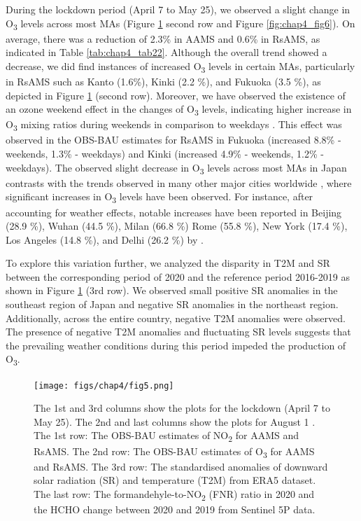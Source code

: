 During the lockdown period (April 7 to May 25), we observed a slight change in O\textsubscript{3} levels across most MAs (Figure \ref{fig:chap4_fig5} second row and Figure \ref{fig:chap4_fig6}). On average, there was a reduction of 2.3\% in AAMS and 0.6\% in RsAMS, as indicated in Table \ref{tab:chap4_tab22}. Although the overall trend showed a decrease, we did find instances of increased O\textsubscript{3} levels in certain MAs, particularly in RsAMS such as Kanto (1.6\%), Kinki (2.2 \%), and Fukuoka (3.5 \%), as depicted in Figure \ref{fig:chap4_fig5} (second row). Moreover, we have observed the existence of an ozone weekend effect in the changes of O\textsubscript{3} levels, indicating higher increase in O\textsubscript{3} mixing ratios during weekends in comparison to weekdays \citep{akimoto2022rethinking}. This effect was observed in the OBS-BAU estimates for RsAMS in Fukuoka (increased 8.8\% - weekends, 1.3\% - weekdays) and Kinki (increased 4.9\% - weekends, 1.2\% - weekdays).
The observed slight decrease in O\textsubscript{3} levels across most MAs in Japan contrasts with the trends observed in many other major cities worldwide \citep{shi2021abrupt,grange2021covid}, where significant increases in O\textsubscript{3} levels have been observed. For instance, after accounting for weather effects, notable increases have been reported in Beijing (28.9 \%), Wuhan (44.5 \%), Milan (66.8 \%) Rome (55.8 \%), New York (17.4 \%), Los Angeles (14.8 \%), and Delhi (26.2 \%) by \citep{shi2021abrupt}.\par
To explore this variation further, we analyzed the disparity in T2M and SR between the corresponding period of 2020 and the reference period 2016-2019 as shown in Figure \ref{fig:chap4_fig5} (3rd row). We observed small positive SR anomalies in the southeast region of Japan and negative SR anomalies in the northeast region. Additionally, across the entire country, negative T2M anomalies were observed. The presence of negative T2M anomalies and fluctuating SR levels suggests that the prevailing weather conditions during this period impeded the production of O\textsubscript{3}. \par

\begin{figure}[p]
    \centering
    \texttt{[image: figs/chap4/fig5.png]}
    \caption[NO\textsubscript{2}, O\textsubscript{3}, SR, T2M, FNR, and HCHO variations in 2020]{The 1st and 3rd columns show the plots for the lockdown (April 7 to May 25). The 2nd and last columns show the plots for August 1 . The 1st row: The OBS-BAU estimates of NO\textsubscript{2} for AAMS and RsAMS. The 2nd row: The OBS-BAU estimates of O\textsubscript{3} for AAMS and RsAMS. The 3rd row: The standardised anomalies of downward solar radiation (SR) and temperature (T2M) from ERA5 dataset. The last row: The formandehyle-to-NO\textsubscript{2} (FNR) ratio in 2020 and the HCHO change between 2020 and 2019 from Sentinel 5P data.}
    \label{fig:chap4_fig5}
\end{figure}

